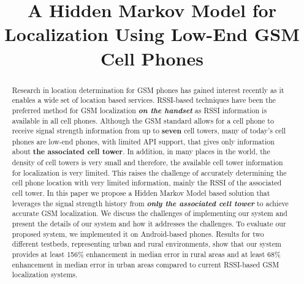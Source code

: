 \documentclass[conference]{IEEEtran}
\begin{document}
\title{A Hidden Markov Model for Localization Using Low-End GSM Cell Phones}


\author{
\and {}
 }










\maketitle


\begin{abstract}
Research in location determination for GSM phones has gained
interest recently as it enables a wide set of location based
services. RSSI-based techniques have been the preferred method for
GSM localization \emph{\textbf{on the handset}} as RSSI information
is available in all cell phones. Although the GSM standard allows
for a cell phone to receive signal strength information from up to
\textbf{seven} cell towers, many of today's cell phones are low-end
phones, with limited API support, that gives only information about
\textbf{the associated cell tower}. In addition, in many places in
the world, the density of cell towers is very small and therefore,
the available cell tower information for localization is very
limited. This raises the challenge of accurately determining the
cell phone location with very limited information, mainly the RSSI
of the associated cell tower. In this paper we propose a Hidden
Markov Model based solution that leverages the signal strength
history from \emph{\textbf{only the associated cell tower}} to
achieve accurate GSM localization. We discuss the challenges of
implementing our system and present the details of our system and
how it addresses the challenges. To evaluate our proposed system, we
implemented it on Android-based phones. Results for two different
testbeds, representing urban and rural environments, show that our
system provides at least 156\% enhancement in  median error in rural
areas and at least 68\% enhancement in median error in urban areas
compared to current RSSI-based GSM localization systems.

\end{abstract}
\end{document}

